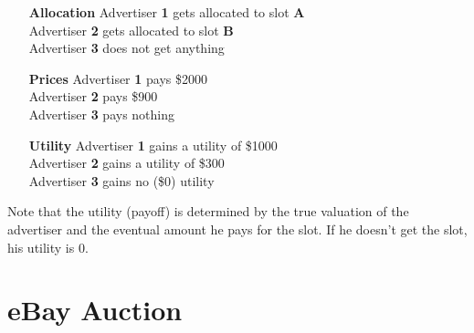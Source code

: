 \documentclass[]{article}
\begin{document}
\begin{enumerate}
	\item[\textbf{Allocation}] 
	Advertiser \textbf{1} gets allocated to slot \textbf{A} \\
	Advertiser \textbf{2} gets allocated to slot \textbf{B} \\
	Advertiser \textbf{3} does not get anything
	
	\item[\textbf{Prices}]
	Advertiser \textbf{1} pays \$2000 \\ 
	Advertiser \textbf{2} pays \$900 \\ 
	Advertiser \textbf{3} pays nothing
	
	\item[\textbf{Utility}] 
	Advertiser \textbf{1} gains a utility of \$1000 \\ 
	Advertiser \textbf{2} gains a utility of \$300 \\ 
	Advertiser \textbf{3} gains no (\$0) utility
	
\end{enumerate}

Note that the utility (payoff) is determined by the true valuation of the advertiser and the eventual amount he pays for the slot. If he doesn't get the slot, his utility is 0.


\newpage
\section{eBay Auction}
\end{document}
